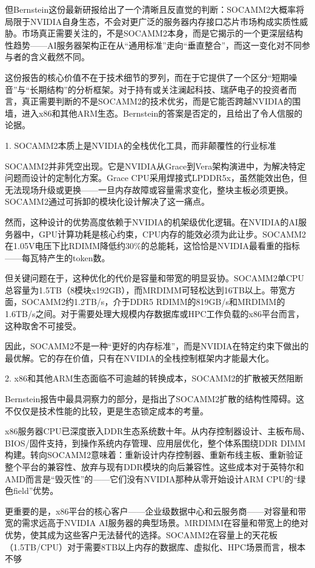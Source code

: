 \documentclass[11pt]{ctexart}
\begin{document}
但Bernstein这份最新研报给出了一个清晰且反直觉的判断：SOCAMM2大概率将局限于NVIDIA自身生态，不会对更广泛的服务器内存接口芯片市场构成实质性威胁。市场真正需要关注的，不是SOCAMM2本身，而是它揭示的一个更深层结构性趋势——AI服务器架构正在从“通用标准”走向“垂直整合”，而这一变化对不同参与者的含义截然不同。

这份报告的核心价值不在于技术细节的罗列，而在于它提供了一个区分“短期噪音”与“长期结构”的分析框架。对于持有或关注澜起科技、瑞萨电子的投资者而言，真正需要判断的不是SOCAMM2的技术优劣，而是它能否跨越NVIDIA的围墙，进入x86和其他ARM生态。Bernstein的答案是否定的，且给出了令人信服的论据。

1. SOCAMM2本质上是NVIDIA的全栈优化工具，而非颠覆性的行业标准

SOCAMM2并非凭空出现。它是NVIDIA从Grace到Vera架构演进中，为解决特定问题而设计的定制化方案。Grace CPU采用焊接式LPDDR5x，虽然能效出色，但无法现场升级或更换——一旦内存故障或容量需求变化，整块主板必须更换。SOCAMM2通过可拆卸的模块化设计解决了这一痛点。

然而，这种设计的优势高度依赖于NVIDIA的机架级优化逻辑。在NVIDIA的AI服务器中，GPU计算功耗是核心约束，CPU内存的能效必须为此让步。SOCAMM2在1.05V电压下比RDIMM降低约30\%的总能耗，这恰恰是NVIDIA最看重的指标——每瓦特产生的token数。

但关键问题在于，这种优化的代价是容量和带宽的明显妥协。SOCAMM2单CPU总容量为1.5TB（8模块x192GB），而MRDIMM可轻松达到16TB以上。带宽方面，SOCAMM2约1.2TB/s，介于DDR5 RDIMM的819GB/s和MRDIMM的1.6TB/s之间。对于需要处理大规模内存数据库或HPC工作负载的x86平台而言，这种取舍不可接受。

因此，SOCAMM2不是一种“更好的内存标准”，而是NVIDIA在特定约束下做出的最优解。它的存在价值，只有在NVIDIA的全栈控制框架内才能最大化。

2. x86和其他ARM生态面临不可逾越的转换成本，SOCAMM2的扩散被天然阻断

Bernstein报告中最具洞察力的部分，是指出了SOCAMM2扩散的结构性障碍。这不仅仅是技术性能的比较，更是生态锁定成本的考量。

x86服务器CPU已深度嵌入DDR生态系统数十年。从内存控制器设计、主板布局、BIOS/固件支持，到操作系统内存管理、应用层优化，整个体系围绕DDR DIMM构建。转向SOCAMM2意味着：重新设计内存控制器、重新布线主板、重新验证整个平台的兼容性、放弃与现有DDR模块的向后兼容性。这些成本对于英特尔和AMD而言是“毁灭性”的——它们没有NVIDIA那种从零开始设计ARM CPU的“绿色field”优势。

更重要的是，x86平台的核心客户——企业级数据中心和云服务商——对容量和带宽的需求远高于NVIDIA AI服务器的典型场景。MRDIMM在容量和带宽上的绝对优势，使其成为这些客户无法替代的选择。SOCAMM2在容量上的天花板（1.5TB/CPU）对于需要8TB以上内存的数据库、虚拟化、HPC场景而言，根本不够
\end{document}
